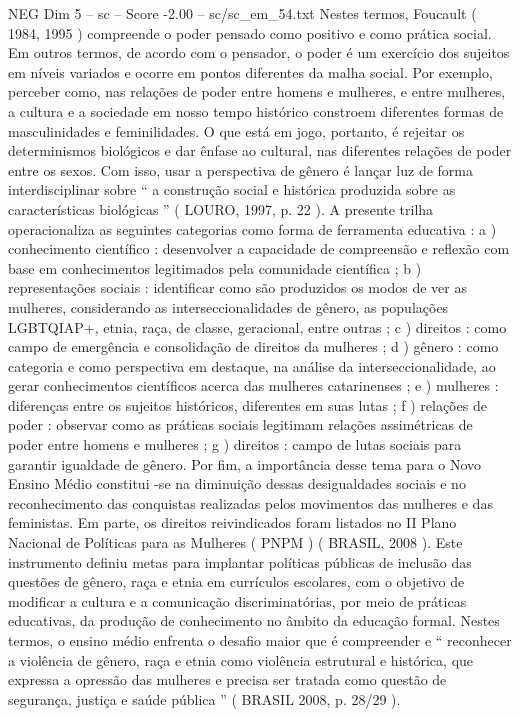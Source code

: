 \begin{textsample}{NEG Dim 5 – sc – Score -2.00 – sc/sc\_em\_54.txt}
Nestes termos, Foucault ( 1984, 1995 ) compreende o poder pensado como positivo e como prática social.
Em outros termos, de acordo com o pensador, o poder é um exercício dos sujeitos em níveis variados e ocorre em pontos diferentes da malha social.
Por exemplo, perceber como, nas relações de poder entre homens e mulheres, e entre mulheres, a cultura e a sociedade em nosso tempo histórico constroem diferentes formas de masculinidades e feminilidades.
O que está em jogo, portanto, é rejeitar os determinismos biológicos e dar ênfase ao cultural, nas diferentes relações de poder entre os sexos.
Com isso, usar a perspectiva de gênero é lançar luz de forma interdisciplinar sobre “ a construção social e histórica produzida sobre as características biológicas ” ( LOURO, 1997, p. 22 ).
A presente trilha operacionaliza as seguintes categorias como forma de ferramenta educativa : a ) conhecimento científico : desenvolver a capacidade de compreensão e reflexão com base em conhecimentos legitimados pela comunidade científica ; b ) representações sociais : identificar como são produzidos os modos de ver as mulheres, considerando as interseccionalidades de gênero, as populações LGBTQIAP+, etnia, raça, de classe, geracional, entre outras ; c ) direitos : como campo de emergência e consolidação de direitos da mulheres ; d ) gênero : como categoria e como perspectiva em destaque, na análise da interseccionalidade, ao gerar conhecimentos científicos acerca das mulheres catarinenses ; e ) mulheres : diferenças entre os sujeitos históricos, diferentes em suas lutas ; f ) relações de poder : observar como as práticas sociais legitimam relações assimétricas de poder entre homens e mulheres ; g ) direitos : campo de lutas sociais para garantir igualdade de gênero.
Por fim, a importância desse tema para o Novo Ensino Médio constitui -se na diminuição dessas desigualdades sociais e no reconhecimento das conquistas realizadas pelos movimentos das mulheres e das feministas.
Em parte, os direitos reivindicados foram listados no II Plano Nacional de Políticas para as Mulheres ( PNPM ) ( BRASIL, 2008 ).
Este instrumento definiu metas para implantar políticas públicas de inclusão das questões de gênero, raça e etnia em currículos escolares, com o objetivo de modificar a cultura e a comunicação discriminatórias, por meio de práticas educativas, da produção de conhecimento no âmbito da educação formal.
Nestes termos, o ensino médio enfrenta o desafio maior que é compreender e “ reconhecer a violência de gênero, raça e etnia como violência estrutural e histórica, que expressa a opressão das mulheres e precisa ser tratada como questão de segurança, justiça e saúde pública ” ( BRASIL 2008, p. 28/29 ).

\end{textsample}

